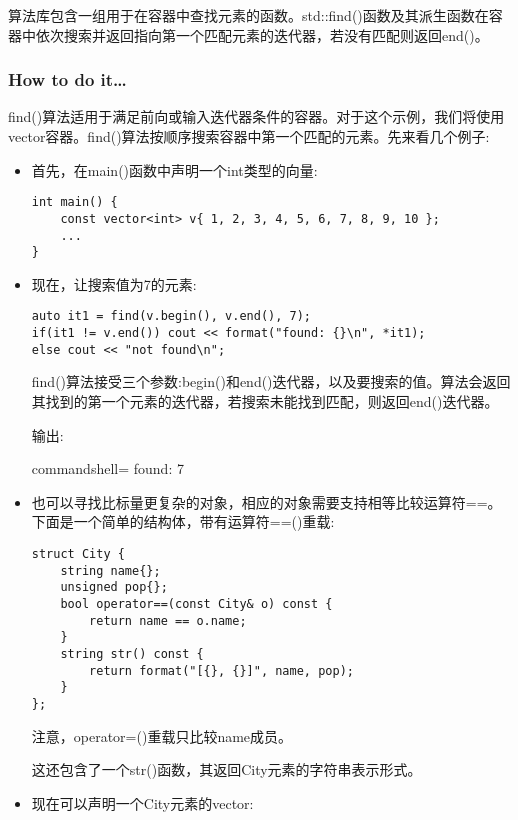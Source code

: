 
算法库包含一组用于在容器中查找元素的函数。std::find()函数及其派生函数在容器中依次搜索并返回指向第一个匹配元素的迭代器，若没有匹配则返回end()。

\subsubsection{How to do it…}

find()算法适用于满足前向或输入迭代器条件的容器。对于这个示例，我们将使用vector容器。find()算法按顺序搜索容器中第一个匹配的元素。先来看几个例子:

\begin{itemize}
\item 
首先，在main()函数中声明一个int类型的向量:

\begin{lstlisting}[style=styleCXX]
int main() {
	const vector<int> v{ 1, 2, 3, 4, 5, 6, 7, 8, 9, 10 };
	...
}
\end{lstlisting}

\item 
现在，让搜索值为7的元素:

\begin{lstlisting}[style=styleCXX]
auto it1 = find(v.begin(), v.end(), 7);
if(it1 != v.end()) cout << format("found: {}\n", *it1);
else cout << "not found\n";
\end{lstlisting}

find()算法接受三个参数:begin()和end()迭代器，以及要搜索的值。算法会返回其找到的第一个元素的迭代器，若搜索未能找到匹配，则返回end()迭代器。

输出:

\begin{tcblisting}{commandshell={}}
found: 7
\end{tcblisting}

\item 
也可以寻找比标量更复杂的对象，相应的对象需要支持相等比较运算符==。下面是一个简单的结构体，带有运算符==()重载:

\begin{lstlisting}[style=styleCXX]
struct City {
	string name{};
	unsigned pop{};
	bool operator==(const City& o) const {
		return name == o.name;
	}
	string str() const {
		return format("[{}, {}]", name, pop);
	}
};
\end{lstlisting}

注意，operator=()重载只比较name成员。

这还包含了一个str()函数，其返回City元素的字符串表示形式。

\item 
现在可以声明一个City元素的vector:


\end{itemize}
